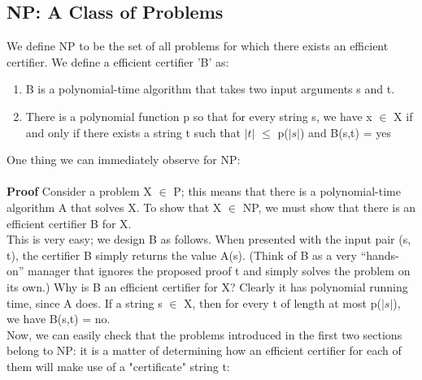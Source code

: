 \documentclass{article}
\begin{document}
\subsection{NP: A Class of Problems}
We define NP to be the set of all problems for which there exists an efficient certifier. We define a efficient certifier 'B' as:\\

\begin{enumerate}
    \item B is a polynomial-time algorithm that takes two input arguments s and t.
    \item There is a polynomial function p so that for every string s, we have x $\in$ X if and only if there exists a string t such that $\lvert t \rvert$ $\le$ p($\lvert s \rvert$) and B(s,t) = yes
\end{enumerate}

One thing we can immediately observe for NP:\\

\\

\textbf{Proof} Consider a problem X $\in$ P; this means that there is a polynomial-time algorithm A that solves X. To show that X $\in$ NP, we must show that there is an efficient certifier B for X.\\

This is very easy; we design B as follows. When presented with the input pair (s, t), the certifier B simply returns the value A(s). (Think of B as a very “hands-on” manager that ignores the proposed proof t and simply solves the problem on its own.) Why is B an efficient certifier for X? Clearly it has polynomial running time, since A does. If a string s $\in$ X, then for every t of length at most p($\lvert s \rvert$), we have B(s,t) = no.\\

Now, we can easily check that the problems introduced in the first two sections belong to NP: it is a matter of determining how an efficient certifier for each of them will make use of a "certificate" string t:\\
\end{document}
